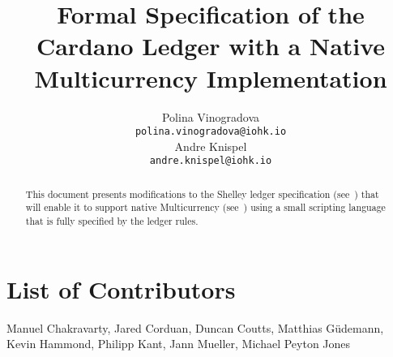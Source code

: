 
\title{Formal Specification of the Cardano Ledger with a Native
Multicurrency Implementation}
\renewcommand{\thepage}{\arabic{page}}
\setcounter{page}{1}

\author{
   Polina Vinogradova \\ {\small \texttt{polina.vinogradova@iohk.io}} \\
   Andre Knispel \\ {\small \texttt{andre.knispel@iohk.io}} \\
   }

\date{}

\maketitle

\begin{abstract}
This document presents modifications to the Shelley ledger
specification
(see~\cite{shelley_spec}) that will enable it to support native
Multicurrency (see~\cite{multi_currency})
using a small scripting language that is fully specified
by the ledger rules.
\end{abstract}

\section*{List of Contributors}
\label{acknowledgements}

Manuel Chakravarty,
Jared Corduan,
Duncan Coutts,
Matthias G\"{u}demann,
Kevin Hammond,
Philipp Kant,
Jann Mueller,
Michael Peyton Jones
